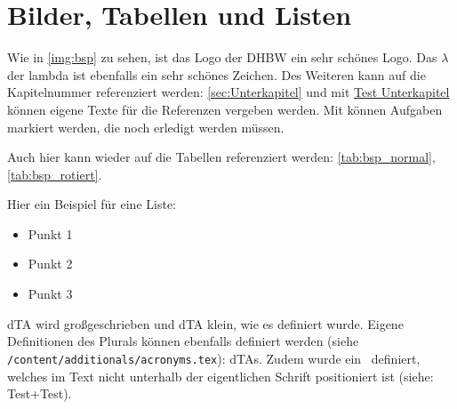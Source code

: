 
\newpage
\section{Bilder, Tabellen und Listen}


Wie in \autoref{img:bsp} zu sehen, ist das Logo der \ac{DHBW} ein sehr schönes Logo. Das $\lambda$ der \ac{lambda} ist ebenfalls ein sehr schönes Zeichen. Des Weiteren kann auf die Kapitelnummer referenziert werden: \autoref{sec:Unterkapitel} und mit \hyperref[sec:Unterkapitel]{Test Unterkapitel} können eigene Texte für die Referenzen vergeben werden. Mit  können Aufgaben markiert werden, die noch erledigt werden müssen. \cite{A01,B01}


\vspace{0.5cm}

Auch hier kann wieder auf die Tabellen referenziert werden: \autoref{tab:bsp_normal}, \autoref{tab:bsp_rotiert}.

\newpage
Hier ein Beispiel für eine Liste:
\begin{itemize}[label=\textbullet]
    \item Punkt 1
    \item Punkt 2
    \item Punkt 3
\end{itemize}

\Acl{dTA} wird großgeschrieben und \ac{dTA} klein, wie es definiert wurde. Eigene Definitionen des Plurals können ebenfalls definiert werden (siehe \texttt{/content/additionals/acronyms.tex}): \acfp{dTA}. Zudem wurde ein \plus\ definiert, welches im Text nicht unterhalb der eigentlichen Schrift positioniert ist (siehe: Test+\plus Test).

